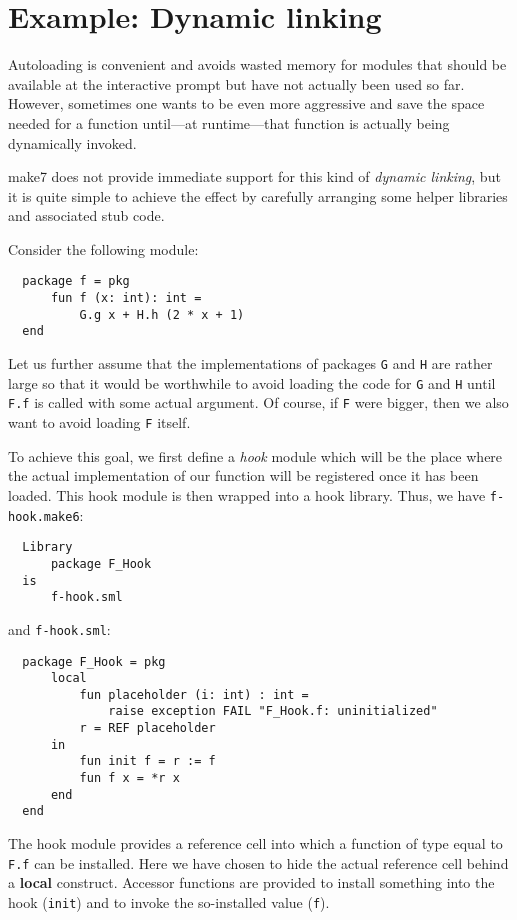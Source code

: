 
\section{Example: Dynamic linking}
\label{sec:dynlink}

Autoloading is convenient and avoids wasted memory for modules that
should be available at the interactive prompt but have not actually
been used so far.  However, sometimes one wants to be even more
aggressive and save the space needed for a function until---at
runtime---that function is actually being dynamically invoked.

make7 does not provide immediate support for this kind of {\em dynamic
linking}, but it is quite simple to achieve the effect by carefully
arranging some helper libraries and associated stub code.

Consider the following module:
\begin{verbatim}
  package f = pkg
      fun f (x: int): int =
          G.g x + H.h (2 * x + 1)
  end
\end{verbatim}

Let us further assume that the implementations of packages {\tt G}
and {\tt H} are rather large so that it would be worthwhile to avoid
loading the code for {\tt G} and {\tt H} until {\tt F.f} is called
with some actual argument.  Of course, if {\tt F} were bigger, then we
also want to avoid loading {\tt F} itself.

To achieve this goal, we first define a {\em hook} module which will
be the place where the actual implementation of our function will be
registered once it has been loaded.  This hook module is then wrapped
into a hook library.  Thus, we have {\tt f-hook.make6}:
\begin{verbatim}
  Library
      package F_Hook
  is
      f-hook.sml
\end{verbatim}

and {\tt f-hook.sml}:

\begin{verbatim}
  package F_Hook = pkg
      local
          fun placeholder (i: int) : int =
              raise exception FAIL "F_Hook.f: uninitialized"
          r = REF placeholder
      in
          fun init f = r := f
          fun f x = *r x
      end
  end
\end{verbatim}

The hook module provides a reference cell into which a function of
type equal to {\tt F.f} can be installed.  Here we have chosen to hide
the actual reference cell behind a {\bf local} construct.  Accessor
functions are provided to install something into the hook
({\tt init}) and to invoke the so-installed value ({\tt f}).

